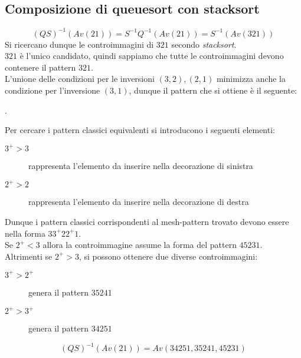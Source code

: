 \subsection{Composizione  di {queuesort} con {stacksort}}
$$(QS)^{-1}(Av(21))=S^{-1}Q^{-1}(Av(21))=S^{-1}(Av(321))$$
Si ricercano dunque le controimmagini di $321$ secondo \textit{stacksort}.\\$321$ \`e l'unico candidato, quindi sappiamo che tutte le controimmagini devono contenere il pattern $321$.\\
L'unione delle condizioni per le inversioni $(3,2),(2,1)$ minimizza anche la condizione per l'inversione $(3,1)$, dunque il pattern che si ottiene \`e il seguente:
\begin{center}
.
\end{center}
Per cercare i pattern classici equivalenti si introducono i seguenti elementi:
\begin{description}
	\item[$3^+>3$] rappresenta l'elemento da inserire nella decorazione di sinistra
	\item[$2^+>2$] rappresenta l'elemento da inserire nella decorazione di destra
\end{description}
Dunque i pattern classici corrispondenti al mesh-pattern trovato devono essere nella forma $33^+22^+1$.\\
Se $2^+<3$ allora la controimmagine assume la forma del pattern $45231$.\\
Altrimenti se $2^+>3$, si possono ottenere due diverse controimmagini:
\begin{description}
	\item[$3^+>2^+$] genera il pattern $35241$
	\item[$2^+>3^+$] genera il pattern $34251$
\end{description}
$$(QS)^{-1}(Av(21)) = Av(34251, 35241, 45231)$$
